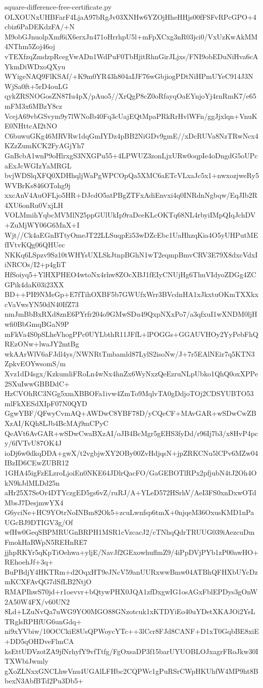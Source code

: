 \documentclass[11pt]{article}
\theoremstyle{definition}
\theoremstyle{remark}
\begin{document}
\begin{filecontents*}[overwrite]{square-difference-free-certificate.py}
OLXOUNxUHBFarF4LjaA97bRgJv03XNHw6YZOjHheHHjs00fFSFvRPcGPO+4cbiz6PaDEKdzFA/+N
M9obGJnuolpXmf6iX6erxJn471oHrrhpU5l+mFpXCxg3nR03jci0/VxUzKwAkMM4NThm5Zoj46oj
vTEXfzqZmdzpRcegVwADn1WdPuF0TbHjitRhnGirJLjxs/FNI9obEDuNiHva6cAYkmDiWDxoQXyu
WYigeNAQ9FlKSAf/+K9m0YR43h804aIJF76wGbjiogPDtNiHPmUYeC914J3NWjSa0ft+5rD4ouLG
qykZRSNOGosZN87Iu4pX/pAuo5//XrQgP8cZ0oRfayqOaEYnjoYj4rnRmK7/e65mFM3x6MBzY8cz
VcejA69vbGSvym9y7lWNoIb40Fq3cUajEQtMpaPRkRrHvlWFn/ggJjxlqn+VnuKE0NHttcAI2tNO
C6buwuGKg46MRVRw1dqGmIYDz4pBB2NiGDv9gmE//xDcRUVa8NzTRwNcx4KZzZumKCK2FyAGjYh7
GnBcbA1wnP9oHlrxgS3NXGPu55+4LPWUZ3zonLjxURw0oqpIe4oDngdG5oUPcaExJcWGIzYaMRGL
bvjWDSlqXFQ0XDHhqljWaPgWPCOpQa5XMC6aETcVLxaJc5x1+nwxozjweRy5WVBrKs846OTohg9j
xxcAnV4AuOFLjo5HR+DJcdO5atPBgZTFxAdiEnvxi4q0INRdnNgbqw/EqJIb2R4XU6onRu0VxjLH
VOLMmihYqbcMVMlN25ppGUlUkIp9raDceKLcOKTq68NL4rbyiIMpQIqJchDV+ZuMjWY06G6MnX+I
Wjt//Ck4aEGnBTtyOmeJT22LLSuqpEi53wDZcEbc1UaHhzqKia4O5yUHPutMEfIVtvKQg06QHUec
NKKq6LSpzv9Sz10tWHYsUXLSkJtnpBGhN1wT2eqmpBmvCRV3E79X8dxcVdxIiNRCOs/I2+p4gIiT
HfSoiyq5+YlHXPHEO4wtoNx4rhw8ZOcXBJ1fEIyCNUjHg6ThuVIdyoZDGg4ZCGPik4daK03i23XX
BD++PH9NMeGp+E7fTihOXBF5b7GWUfxWrr3BVcdnHA1xJkxtuOKmTXXkxcVaVwsYN50dN40IfZ73
nmJmBbBxRXd8znE6PYrfr204o9GMwSDu49QxpNXxPo7/a3qfxuI1wXNDM0ljHwfi0BbGmqBGaN9P
mFkVa4S0pSLheVhogPPc0UYLbthR11JFfL+lPOGGs+GGAUVHOy2YyPebFhQREzONw+lwaJY2mtBg
wkAArWlV6aFJdl4ys/NWNRtTmbamld87LylS2isoNw/J+7r5EAlNEir7q5KTN3ZpkvEOYwsomS/m
Xvz1dD4sgx/KzkumliFRoLn4wNx4hnZx6WyNxzQeEzruNLpUbko1QhQ0oxXPPe2SXuIwwGBBDdC+
HzCVOhRC3NGg5xmXBBOFa1ivw4ZmTo9MqlvTA0gDdjoTOj2CDSYUBTO53mlFkXESdXIpF07N0QYD
GgwYBF/QFwyCvmAQ+AWDwC8YBF78D/yCQeCF+MAvGAR+wSDwCwZBXzAI/KQh8LJb4BcMAj9mCPyC
QeAVt6AvGAR+wSDwCwaBXzAI/oJB4BcMgr5gEHS3fyDd/r96Ij7b3/x8HvP4pcy/6fVTvU87OK4J
ioDj6w0dkqDDA+gwX/t2vgbjwXY2OBy00ZvHdjqsN+jpZRKCNu5lCPv6MZw04IBzID6CEwZUBR12
1GHA45igFzELzroLjoiEn0NKE64JDlrQacFO/GaGEBOTlRPx2pfjubN4tJ2Oh4OkN9kJdMLDd25n
aHr25X7SeOr4DTYczgED5gs6vZ/ruRJ/A+YLeD572HSrhV/AeI3FS0xnDxwOTdMbsJ7DesjmwYX4
G6yciNe+HC9YOtrNoINBm82Ok5+zcuLwnfsp6tmX+0njqeM36OxusKMD1nPaUGcBJ9DTIGV3g/Of
wfHw0GeqSBPMRUGnBRPH1MSR1cVzcacJ2/cTNhqQdrTRUUG039iAezcuDmFmokHaRWpN5REHnRE7
jjhpRKYr5qKpTiOehwa+yljE/NavJf2GExowhuflmZ9/4iPpDVjPYb1zP00awHO+REhoehJf+3q+
BuPBdjY4HKTRm+d2OqxHT9eJNcV59anUURxwwBmw04ATBhQFHXbUYcDzmKCXFAvQG7dSfLB2NtjO
RMAPIhwS70jd+r1oevvr+bQtywPHX0JQA1zfDxgwIG1osAGxFblEPDys3gOnW2A50W4FX/v60UN2
8Ld+LZuNvQa7uWG9YO0MGO88GNzotcuk1xKTDYiEo40uYDetXKAJOi2YsLTRglsRPHfUG6unGdq+
ni9xYVbiw/10OCCkiE8UsQPWoycYTc++3lCcr8FJd8CANF+D1xT0GqbBE8xiE+DD5qOHDveFlmCA
ksEttUDVzotZA9jfNrhyfY9vfTtfg/FgOxsaDP3f15barUYUOBLOJxagrFRoJkw30ITXWbiJwmly
gXoZLNxxGNCLhwVnu4UGAlLFHbc2CQPWc1gPuRSrCWpHKUhfW4MP9ht8BbexN3AbfBTd2Pu3Db5+

\end{filecontents*}
\end{document}
